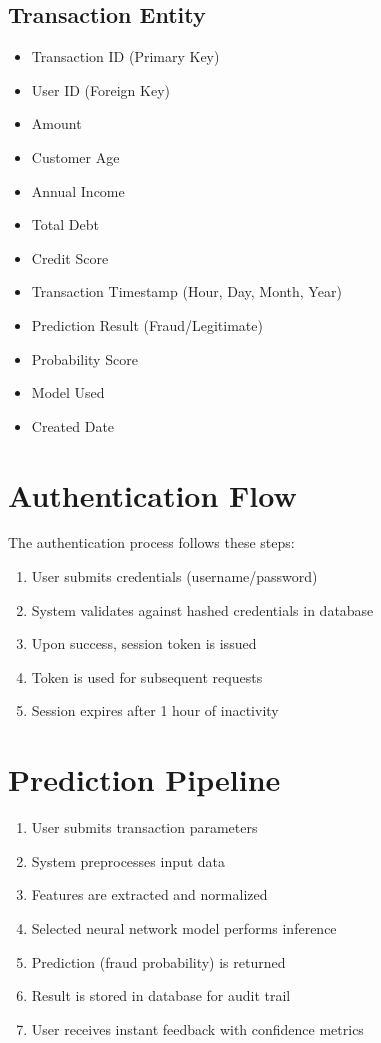 \documentclass[12pt,a4paper,twoside]{report}
\begin{document}
\subsection{Transaction Entity}

\begin{itemize}
    \item Transaction ID (Primary Key)
    \item User ID (Foreign Key)
    \item Amount
    \item Customer Age
    \item Annual Income
    \item Total Debt
    \item Credit Score
    \item Transaction Timestamp (Hour, Day, Month, Year)
    \item Prediction Result (Fraud/Legitimate)
    \item Probability Score
    \item Model Used
    \item Created Date
\end{itemize}

\section{Authentication Flow}

The authentication process follows these steps:

\begin{enumerate}
    \item User submits credentials (username/password)
    \item System validates against hashed credentials in database
    \item Upon success, session token is issued
    \item Token is used for subsequent requests
    \item Session expires after 1 hour of inactivity
\end{enumerate}

\section{Prediction Pipeline}

\begin{enumerate}
    \item User submits transaction parameters
    \item System preprocesses input data
    \item Features are extracted and normalized
    \item Selected neural network model performs inference
    \item Prediction (fraud probability) is returned
    \item Result is stored in database for audit trail
    \item User receives instant feedback with confidence metrics
\end{enumerate}
\end{document}
